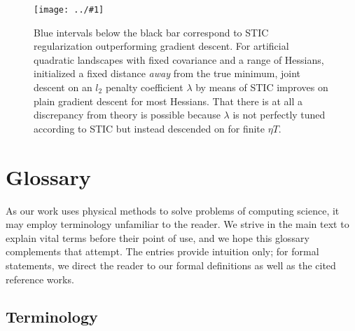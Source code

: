 \documentclass{article}
\theoremstyle{plain}
\theoremstyle{definition}
\newcommand{\plotmoow}[3]{\texttt{[image: ../\#1]}}
\begin{document}
    \begin{figure}[h] 
        \centering
        \plotmoow{plots/tak-reg}{0.98\columnwidth}{4.0cm}
        \caption{
            Blue intervals below the black bar correspond to STIC
            regularization outperforming gradient descent. For artificial
            quadratic landscapes with fixed covariance and a range of Hessians,
            initialized a fixed distance \emph{away} from the true minimum,
            joint descent on an $l_2$ penalty coefficient $\lambda$ by means of
            STIC improves on plain gradient descent for most Hessians.  That
            there is at all a discrepancy from theory is possible because
            $\lambda$ is not perfectly tuned according to STIC but instead
            descended on for finite $\eta T$.
        }
        \label{fig:takreg}
    \end{figure}

\section{Glossary}\label{sect:glossary}

    As our work uses physical methods to solve problems of computing science,
    it may employ terminology unfamiliar to the reader.  We strive in the main
    text to explain vital terms before their point of use, and we hope this
    glossary complements that attempt.  The entries provide intuition only;
    for formal statements, we direct the reader to our formal definitions as
    well as the cited reference works.

    \subsection{Terminology}
\end{document}
